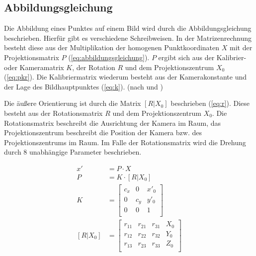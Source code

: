 \documentclass[./00PhotoBox.tex]{subfiles}
\begin{document}
\subsection{Abbildungsgleichung}
\label{ss:abbildungsgleichung}
Die Abbildung eines Punktes auf einem Bild wird durch die Abbildungsgleichung beschrieben. Hierfür gibt es verschiedene Schreibweisen. In der Matrizenrechnung besteht diese aus der Multiplikation der homogenen Punktkoordinaten $X$ mit der Projektionsmatrix $P$ (\autoref{eq:abbildungsgleichung}). $P$ ergibt sich aus der Kalibrier- oder Kameramatrix $K$, der Rotation $R$ und dem Projektionszentrum $X_0$ (\autoref{eq:pkr}). Die Kalibriermatrix wiederum besteht aus der Kamerakonstante und der Lage des Bildhauptpunktes (\autoref{eq:k}).
(nach \citealp[S. 244]{hartley} und \citealp[S. 290]{luhmann})

Die äußere Orientierung ist durch die Matrix $[R|X_0]$ beschrieben (\autoref{eq:r}). Diese besteht aus der Rotationsmatrix $R$ und dem Projektionszentrum $X_0$. Die Rotationsmatrix beschreibt die Ausrichtung der Kamera im Raum, das Projektionszentrum beschreibt die Position der Kamera bzw. des Projektionszentrums im Raum. Im Falle der Rotationsmatrix wird die Drehung durch 8 unabhängige Parameter beschrieben.


\begin{align}
    \label{eq:abbildungsgleichung}
    x'      & = P \cdot X       \\
    \label{eq:pkr}
    P       & = K \cdot [R|X_0] \\
    \label{eq:k}
    K       & =
    \begin{bmatrix}
        c_x & 0   & x'_0 \\
        0   & c_y & y'_0 \\
        0   & 0   & 1    \\
    \end{bmatrix}            \\
    \label{eq:r}
    [R|X_0] & =
    \begin{bmatrix}
        r_11 & r_21 & r_31 & X_0 \\
        r_12 & r_22 & r_32 & Y_0 \\
        r_13 & r_23 & r_33 & Z_0 \\
    \end{bmatrix}
\end{align}

\end{document}
